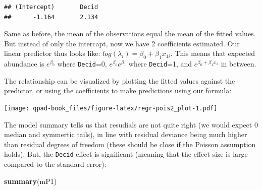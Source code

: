 \documentclass[12pt,]{book}
\newenvironment{Shaded}{\begin{snugshade}}{\end{snugshade}}
\newcommand{\DataTypeTok}[1]{\textcolor[rgb]{0.13,0.29,0.53}{#1}}
\newcommand{\DecValTok}[1]{\textcolor[rgb]{0.00,0.00,0.81}{#1}}
\newcommand{\FloatTok}[1]{\textcolor[rgb]{0.00,0.00,0.81}{#1}}
\newcommand{\KeywordTok}[1]{\textcolor[rgb]{0.13,0.29,0.53}{\textbf{#1}}}
\newcommand{\NormalTok}[1]{#1}
\newcommand{\OperatorTok}[1]{\textcolor[rgb]{0.81,0.36,0.00}{\textbf{#1}}}
\newcommand{\StringTok}[1]{\textcolor[rgb]{0.31,0.60,0.02}{#1}}
\begin{document}
\begin{verbatim}
## (Intercept)       Decid 
##      -1.164       2.134
\end{verbatim}

Same as before, the mean of the observations equal the mean of the fitted values.
But instead of only the intercapt, now we have 2 coefficients estimated.
Our linear predictor thus looks like:
\(log(\lambda_i) = \beta_0 + \beta_1 x_{1i}\). This means that expected abundance is
\(e^{\beta_0}\) where \texttt{Decid}=0,
\(e^{\beta_0}e^{\beta_1}\) where \texttt{Decid}=1,
and \(e^{\beta_0+\beta_1 x_{1}}\) in between.

The relationship can be visualized by plotting the fitted values against the predictor,
or using the coefficients to make predictions using our formula:

\begin{Shaded}
\end{Shaded}

\texttt{[image: qpad-book\_files/figure-latex/regr-pois2\_plot-1.pdf]}

The model summary tells us that resudials are not quite right (we would expect
0 median and symmertic tails), in line with residual deviance
being much higher than residual degrees of freedom
(these should be close if the Poisson assumption holds).
But, the \texttt{Decid} effect is significant (meaning that the effect size is
large compared to the standard error):

\begin{Shaded}
\begin{Highlighting}[]
\KeywordTok{summary}\NormalTok{(mP1)}
\end{Highlighting}
\end{Shaded}
\end{document}
